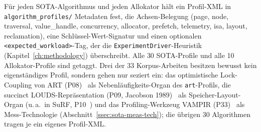 Für jeden SOTA-Algorithmus und jeden Allokator hält ein Profil-XML in \texttt{algorithm\_profiles/}
Metadaten fest, die Achsen-Belegung (page, node, traversal, value\_handle, concurrency, allocator,
prefetch, telemetry, isa, layout, reclamation), eine Schlüssel-Wert-Signatur und einen optionalen
\texttt{<expected\_workload>}-Tag, der die \texttt{ExperimentDriver}-Heuristik
(Kapitel~\ref{ch:methodology}) überschreibt. Alle 30 SOTA-Profile und alle 10 Allokator-Profile sind
getaggt. Drei der 33 Korpus-Arbeiten besitzen bewusst kein eigenständiges Profil, sondern gehen nur
seziert ein: das optimistische Lock-Coupling von ART (P08)~\cite{leis2016olc} als
Nebenläufigkeits-Organ des \texttt{art}-Profils, die succinct LOUDS-Repräsentation (P09, Jacobson
1989)~\cite{jacobson1989louds} als Speicher-Layout-Organ (u.\,a.\ in SuRF, P10~\cite{zhang2018surf})
und das Profiling-Werkzeug VAMPIR (P33)~\cite{berthold2023vampir} als Mess-Technologie
(Abschnitt~\ref{ssec:sota-meas-tech}); die übrigen 30 Algorithmen tragen je ein eigenes Profil-XML\@.

